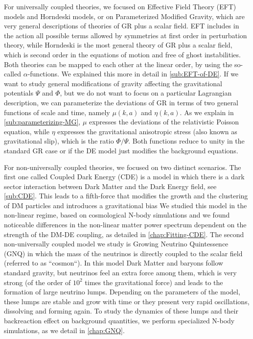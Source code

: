 For universally coupled theories, we focused on Effective Field Theory (EFT) models and Horndeski models, or on Parameterized Modified Gravity, which
are very general descriptions of theories of GR plus a scalar field.
EFT includes in the action all possible terms allowed by symmetries at first order in perturbation theory, while Horndeski is the most general theory
of GR plus a scalar field, which is second order in the equations of motion and free of ghost instabilities.
Both theories can be mapped to each other at the linear order, by using the so-called $\alpha$-functions.
We explained this more in detail in \cref{sub:EFT-of-DE}.
If we want to study general modifications of gravity affecting the gravitational potentials $\Psi$ and $\Phi$, but we do not want to focus on a particular Lagrangian description, we can parameterize the deviations of GR in terms of two
general functions of scale and time, namely $\mu(k,a)$ and $\eta(k,a)$. As we explain in \cref{sub:parameterizing-MG}, $\mu$ expresses the deviations of the relativistic Poisson equation, while $\eta$
expresses the gravitational anisotropic stress (also known as gravitational slip), which is the ratio $\Phi/\Psi$.
Both functions reduce to unity in the standard GR case or if the DE model just modifies the background equations.

For non-universally coupled theories, we focused on two distinct scenarios. The first one called Coupled Dark Energy
(CDE) is a model in which there is a dark sector interaction between Dark Matter and the Dark Energy field, see \cref{sub:CDE}. This leads to a fifth-force that modifies the growth and the clustering of DM particles and introduces a gravitational bias 
We studied this model in the non-linear regime, based on cosmological N-body simulations and we found
noticeable differences in the non-linear matter power spectrum dependent on the strength of the DM-DE coupling, as detailed in \cref{chap:Fitting-CDE}.
The second non-universally coupled model we study is Growing Neutrino Quintessence (GNQ) in which
the mass of the neutrinos is directly coupled to the scalar field (referred to as ``cosmon``).
In this model Dark Matter and baryons follow standard gravity, but neutrinos feel an extra force among them, which
is very strong (of the order of $10^2$ times the gravitational force) and leads to the formation of large neutrino lumps. Depending on the parameters of the model, these lumps are stable and grow with time
or they present very rapid oscillations, dissolving and forming again. To study the dynamics of these lumps
and their backreaction effect on background quantities, we perform specialized N-body simulations, as we 
detail in \cref{chap:GNQ}. 













